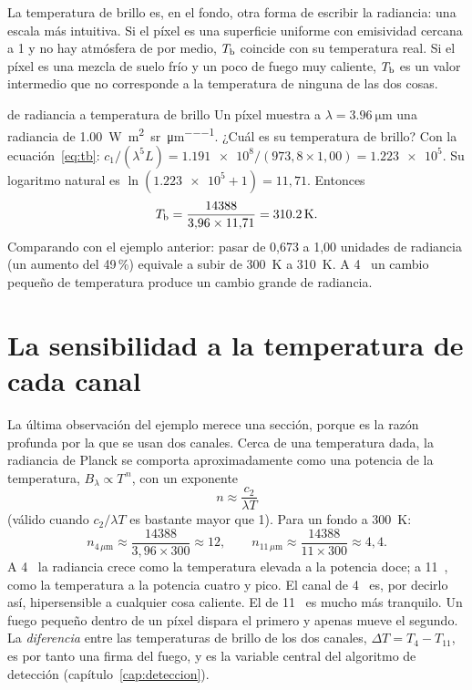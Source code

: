 La temperatura de brillo es, en el fondo, otra forma de escribir la radiancia: una escala más
intuitiva. Si el píxel es una superficie uniforme con emisividad cercana a 1 y no hay atmósfera
de por medio, $T_{\mathrm{b}}$ coincide con su temperatura real. Si el píxel es una mezcla de suelo frío y
un poco de fuego muy caliente, $T_{\mathrm{b}}$ es un valor intermedio que no corresponde a la temperatura
de ninguna de las dos cosas.

\begin{ejemplo}{de radiancia a temperatura de brillo}
Un píxel muestra a $\lambda = \SI{3.96}{\micro\metre}$ una radiancia de
\SI{1.00}{\watt\per\square\metre\per\steradian\per\micro\metre}. ¿Cuál es su temperatura de
brillo?
\solucion Con la ecuación~\eqref{eq:tb}: $c_1/(\lambda^5 L) = \num{1.191e8}/(973{,}8 \times
1{,}00) = \num{1.223e5}$. Su logaritmo natural es $\ln(\num{1.223e5} + 1) = 11{,}71$. Entonces
\[
  T_{\mathrm{b}} = \frac{14388}{3{,}96 \times 11{,}71} = \SI{310.2}{\kelvin}.
\]
Comparando con el ejemplo anterior: pasar de 0,673 a 1,00 unidades de radiancia (un aumento del
49\,{}\%) equivale a subir de 300~K a 310~K. A 4~\um{} un cambio pequeño de temperatura produce un
cambio grande de radiancia.
\end{ejemplo}

\section{La sensibilidad a la temperatura de cada canal}

La última observación del ejemplo merece una sección, porque es la razón profunda por la que se
usan dos canales. Cerca de una temperatura dada, la radiancia de Planck se comporta
aproximadamente como una potencia de la temperatura, $B_\lambda \propto T^{\,n}$, con un
exponente
\begin{equation}
  n \approx \frac{c_2}{\lambda T}
\end{equation}
(válido cuando $c_2/\lambda T$ es bastante mayor que 1). Para un fondo a 300~K:
\[
  n_{4\,\mu\text{m}} \approx \frac{14388}{3{,}96\times 300} \approx 12,
  \qquad
  n_{11\,\mu\text{m}} \approx \frac{14388}{11\times 300} \approx 4{,}4 .
\]
A 4~\um{} la radiancia crece como la temperatura elevada a la potencia doce; a 11~\um, como la
temperatura a la potencia cuatro y pico. El canal de 4~\um{} es, por decirlo así, hipersensible
a cualquier cosa caliente. El de 11~\um{} es mucho más tranquilo. Un fuego pequeño dentro de un
píxel dispara el primero y apenas mueve el segundo. La \emph{diferencia} entre las temperaturas
de brillo de los dos canales, $\Delta T = T_4 - T_{11}$, es por tanto una firma del fuego, y es
la variable central del algoritmo de detección (capítulo~\ref{cap:deteccion}).

